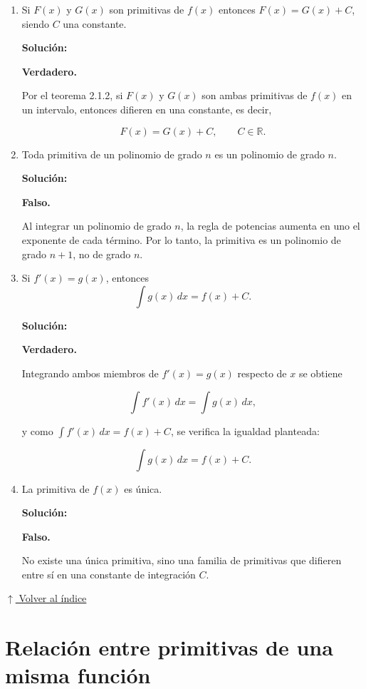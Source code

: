 \documentclass[12pt]{article}
\newcommand{\solucion}{%
    \vspace{0.8em}%
    \textbf{Solución:}%
}
\newcommand{\volverindice}{%
    \vspace{1em}%
    \begin{flushright}%
        \hyperlink{indice}{\small $\uparrow$ Volver al índice}%
    \end{flushright}%
}
\begin{document}
\begin{enumerate}[label=\alph*.-]

    \item Si $F(x)$ y $G(x)$ son primitivas de $f(x)$ entonces
    $F(x)=G(x)+C$, siendo $C$ una constante.

    \solucion

    \textbf{Verdadero.}

    Por el teorema 2.1.2, si $F(x)$ y $G(x)$ son ambas primitivas de
    $f(x)$ en un intervalo, entonces difieren en una constante, es decir,

    \[
    F(x)=G(x)+C,
    \qquad C\in\mathbb{R}.
    \]


    \item Toda primitiva de un polinomio de grado $n$ es un polinomio de
    grado $n$.

    \solucion

    \textbf{Falso.}

    Al integrar un polinomio de grado $n$, la regla de potencias aumenta
    en uno el exponente de cada término. Por lo tanto, la primitiva es un
    polinomio de grado $n+1$, no de grado $n$.


    \item Si $f'(x)=g(x)$, entonces
    \[
    \int g(x)\,dx=f(x)+C.
    \]

    \solucion

    \textbf{Verdadero.}

    Integrando ambos miembros de $f'(x)=g(x)$ respecto de $x$ se obtiene

    \[
    \int f'(x)\,dx=\int g(x)\,dx,
    \]

    y como $\displaystyle\int f'(x)\,dx=f(x)+C$, se verifica la igualdad
    planteada:

    \[
    \int g(x)\,dx=f(x)+C.
    \]


    \item La primitiva de $f(x)$ es única.

    \solucion

    \textbf{Falso.}

    No existe una única primitiva, sino una familia de primitivas que
    difieren entre sí en una constante de integración $C$.

\end{enumerate}

\volverindice
\newpage


\section{Relación entre primitivas de una misma función}
\end{document}
